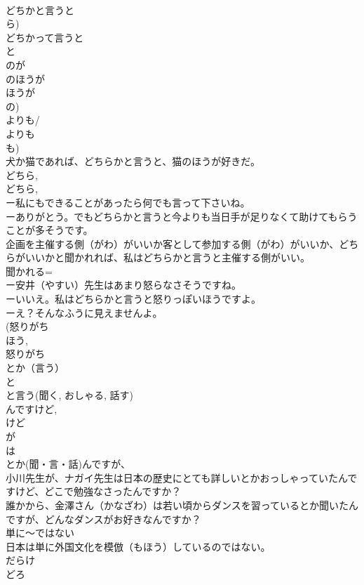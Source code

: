 \documentclass[8pt]{extreport}
\begin{document}
\begin{CJK}{UTF8}{min}
\\	どちかと言うと　
\\	ら) 
\\	どちかって言うと
\\	と
\\	のが
\\	のほうが
\\	ほうが
\\	の) 
\\	よりも/
\\	よりも 
\\	も)
\\	犬か猫であれば、どちらかと言うと、猫のほうが好きだ。
\\	どちら, 
\\	どちら, 
\\	ー私にもできることがあったら何でも言って下さいね。
\\	ーありがとう。でもどちらかと言うと今よりも当日手が足りなくて助けてもらうことが多そうです。
\\	企画を主催する側（がわ）がいいか客として参加する側（がわ）がいいか、どちらがいいかと聞かれれば、私はどちらかと言うと主催する側がいい。
\\	聞かれる=
\\	ー安井（やすい）先生はあまり怒らなさそうですね。
\\	ーいいえ。私はどちらかと言うと怒りっぽいほうですよ。
\\	ーえ？そんなふうに見えませんよ。
\\	(怒りがち 
\\	ほう, 
\\	怒りがち 
\\	とか（言う）
\\	と 
\\	と言う(聞く, おしゃる, 話す)
\\	んですけど, 
\\	けど 
\\	が
\\	は
\\	とか(聞・言・話)んですが、
\\	小川先生が、ナガイ先生は日本の歴史にとても詳しいとかおっしゃっていたんですけど、どこで勉強なさったんですか？
\\	誰かから、金澤さん（かなざわ）は若い頃からダンスを習っているとか聞いたんですが、どんなダンスがお好きなんですか？
\\	単に～ではない
\\	日本は単に外国文化を模倣（もほう）しているのではない。
\\	だらけ
\\	どろ 

\end{CJK}
\end{document}
